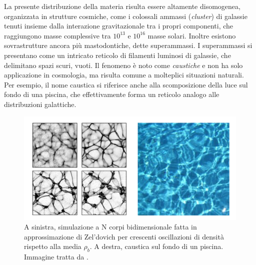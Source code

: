 La presente distribuzione della materia risulta essere altamente disomogenea, organizzata in strutture 
cosmiche, come i colossali ammassi (\textit{cluster}) di galassie tenuti insieme dalla
interazione gravitazionale tra i propri componenti, che raggiungono masse complessive tra $10^{13}$
e $10^{16}$ masse solari. Inoltre esistono sovrastrutture ancora più mastodontiche, dette superammassi.
I superammassi si presentano come un intricato reticolo di filamenti luminosi di galassie, che delimitano
spazi scuri, vuoti. Il fenomeno è noto come \textit{caustiche} e non ha solo applicazione in cosmologia, ma 
risulta comune a molteplici situazioni naturali. Per esempio, il nome caustica si riferisce anche alla scomposizione
della luce sul fondo di una piscina, che effettivamente forma un reticolo analogo alle distribuzioni galattiche.

\begin{center}
	\begin{figure}[H]
		\centering
		\includegraphics[scale=0.25, angle=0]{caustica.png}
        \caption{A sinistra, simulazione a N corpi bidimensionale fatta in approssimazione di Zel'dovich per crescenti
        oscillazioni di densità rispetto alla media $\rho_b$. A destra, caustica sul fondo di un piscina. Immagine tratta da \cite{gurbatov}.}
		\label{fig:caustica}
	\end{figure}
\end{center}

